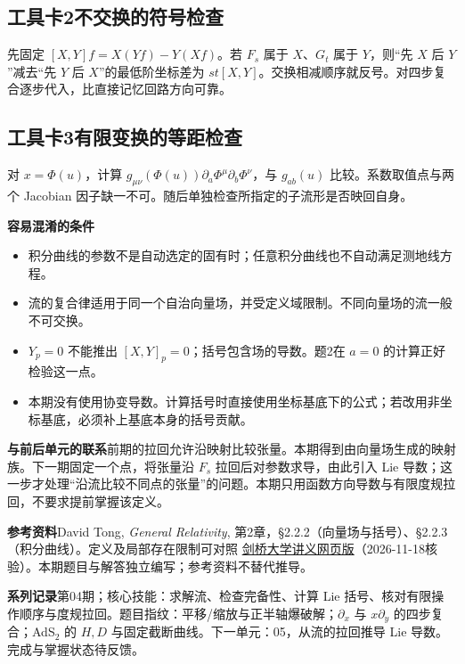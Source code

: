 \documentclass[11pt,a4paper]{article}
\begin{document}
\subsection*{工具卡2\quad 不交换的符号检查}
先固定 $[X,Y]f=X(Yf)-Y(Xf)$。若 $F_s$ 属于 $X$、$G_t$ 属于 $Y$，则“先 $X$ 后 $Y$”减去“先 $Y$ 后 $X$”的最低阶坐标差为 $st[X,Y]$。交换相减顺序就反号。对四步复合逐步代入，比直接记忆回路方向可靠。
\subsection*{工具卡3\quad 有限变换的等距检查}
对 $x=\Phi(u)$，计算 $g_{\mu\nu}(\Phi(u))\partial_a\Phi^\mu\partial_b\Phi^\nu$，与 $g_{ab}(u)$ 比较。系数取值点与两个 Jacobian 因子缺一不可。随后单独检查所指定的子流形是否映回自身。

\textbf{容易混淆的条件}
\begin{itemize}
\item 积分曲线的参数不是自动选定的固有时；任意积分曲线也不自动满足测地线方程。
\item 流的复合律适用于同一个自治向量场，并受定义域限制。不同向量场的流一般不可交换。
\item $Y_p=0$ 不能推出 $[X,Y]_p=0$；括号包含场的导数。题2在 $a=0$ 的计算正好检验这一点。
\item 本期没有使用协变导数。计算括号时直接使用坐标基底下的公式；若改用非坐标基底，必须补上基底本身的括号贡献。
\end{itemize}

\textbf{与前后单元的联系}\quad 前期的拉回允许沿映射比较张量。本期得到由向量场生成的映射族。下一期固定一个点，将张量沿 $F_s$ 拉回后对参数求导，由此引入 Lie 导数；这一步才处理“沿流比较不同点的张量”的问题。本期只用函数方向导数与有限度规拉回，不要求提前掌握该定义。

\textbf{参考资料}\quad David Tong, \emph{General Relativity}, 第2章，§2.2.2（向量场与括号）、§2.2.3（积分曲线）。定义及局部存在限制可对照
\href{https://www.damtp.cam.ac.uk/user/tong/gr/grhtml/S2.html}{剑桥大学讲义网页版}（2026-11-18核验）。本期题目与解答独立编写；参考资料不替代推导。

\textbf{系列记录}\quad 第04期；核心技能：求解流、检查完备性、计算 Lie 括号、核对有限操作顺序与度规拉回。题目指纹：平移/缩放与正半轴爆破解；$\partial_x$ 与 $x\partial_y$ 的四步复合；AdS$_2$ 的 $H,D$ 与固定截断曲线。下一单元：05，从流的拉回推导 Lie 导数。完成与掌握状态待反馈。
\end{document}
